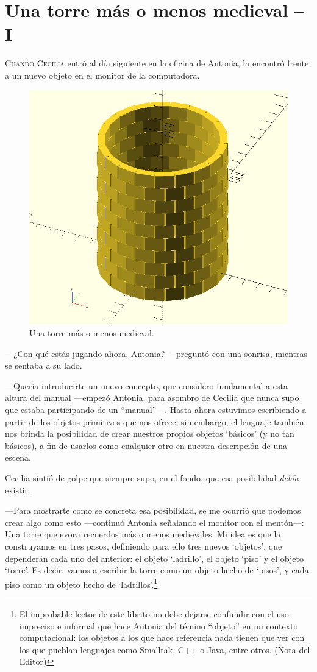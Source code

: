 \chapter{Una torre más o menos medieval -- I}

\lettrine[lines=2]{C}{uando Cecilia} entró al día siguiente en la
oficina de Antonia, la encontró frente a un nuevo objeto en el monitor
de la computadora.


\begin{figure}[ht]
  \centering
  \includegraphics[width=.55\textwidth]{imagenes/torre-tentativa}  
  \caption{Una torre más o menos medieval.}
  \label{fig:torre-tentativa}
\end{figure}



---¿Con qué estás jugando ahora, Antonia? ---preguntó con una sonrisa,
mientras se sentaba a su lado.

---Quería introducirte un nuevo concepto, que considero fundamental a
esta altura del manual ---empezó Antonia, para asombro de Cecilia que
nunca supo que estaba participando de un ``manual''---. Hasta ahora
estuvimos escribiendo a partir de los objetos primitivos que
\openscad{} nos ofrece; sin embargo, el lenguaje también nos brinda la
posibilidad de crear nuestros propios objetos `básicos' (y no tan
básicos), a fin de usarlos como cualquier otro en nuestra descripción
de una escena.

Cecilia sintió de golpe que siempre supo, en el fondo, que esa
posibilidad \emph{debía} existir.

---Para mostrarte cómo se concreta esa posibilidad, se me ocurrió que
podemos crear algo como esto ---continuó Antonia señalando el monitor
con el mentón---: Una torre que evoca recuerdos más o menos
medievales. Mi idea es que la construyamos en tres pasos, definiendo
para ello tres nuevos `objetos', que dependerán cada uno del anterior:
el objeto `ladrillo', el objeto `piso' y el objeto `torre'. Es decir,
vamos a escribir la torre como un objeto hecho de `pisos', y cada piso
como un objeto hecho de `ladrillos'.\footnote{El improbable lector de
  este librito no debe dejarse confundir con el uso impreciso e
  informal que hace Antonia del témino ``objeto'' en un contexto
  computacional: los objetos a los que hace referencia nada tienen que
  ver con los que pueblan lenguajes como Smalltak, C++ o Java, entre
  otros. (Nota del Editor)}

